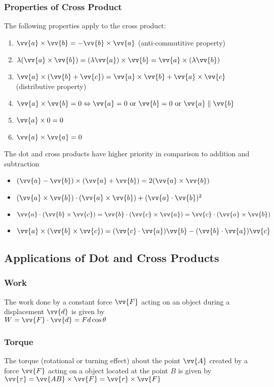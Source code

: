 \documentclass{article}
\begin{document}
	\subsubsection{Properties of Cross Product}
	The following properties apply to the cross product:
	\begin{enumerate}
		\item $\vv{a}\times\vv{b}=-\vv{b}\times\vv{a}$ (anti-commutitive property)
		\item $\lambda(\vv{a}\times\vv{b})=(\lambda\vv{a})\times\vv{b}=\vv{a}\times(\lambda\vv{b})$
		\item $\vv{a}\times(\vv{b}+\vv{c})=\vv{a}\times\vv{b}+\vv{a}\times\vv{c}$ (distributive property)
		\item $\vv{a}\times\vv{b}=0\Leftrightarrow\vv{a}=0\text{ or }\vv{b}=0\text{ or }\vv{a}\parallel\vv{b}$
		\item $\vv{a}\times0=0$
		\item $\vv{a}\times\vv{a}=0$
	\end{enumerate}
	The dot and cross products have higher priority in comparison to addition and subtraction
	\begin{itemize}
		\item $(\vv{a}-\vv{b})\times(\vv{a}+\vv{b})=2(\vv{a}\times\vv{b})$
		\item $(\vv{a}\times\vv{b})\cdot(\vv{a}\times\vv{b})+(\vv{a}\cdot\vv{b})^2$
		\item $\vv{a}\cdot(\vv{b}\times\vv{c})=\vv{b}\cdot(\vv{c}\times\vv{a})=\vv{c}\cdot(\vv{a}\times\vv{b})$
		\item $\vv{a}\times(\vv{b}\times\vv{c})=(\vv{c}\cdot\vv{a})\vv{b}-(\vv{b}\cdot\vv{a})\vv{c}$
	\end{itemize}
	\subsection{Applications of Dot and Cross Products}
	\subsubsection{Work}
	The work done by a constant force $\vv{F}$ acting on an object during a displacement $\vv{d}$ is given by\\$W=\vv{F}\cdot\vv{d}=Fd\cos\theta$
	\subsubsection{Torque}
	The torque (rotational or turning effect) about the point $\vv{A}$ created by a force $\vv{F}$ acting on a object located at the point $B$ is given by $\vv{\tau}=\vv{AB}\times\vv{F}=\vv{r}\times\vv{F}$
\end{document}

